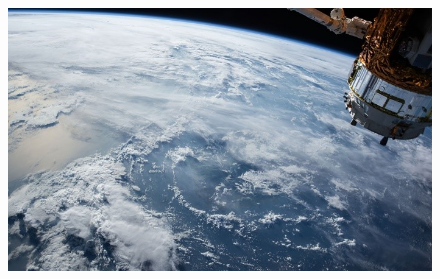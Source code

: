 \begin{figure}
    \includegraphics[width=\textwidth]{Imagenes/satelite.jpg}
     \hfill
    \label{satelite}
\end{figure}